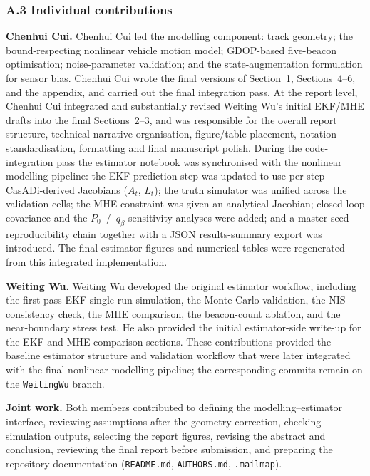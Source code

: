 \documentclass[11pt,a4paper]{article}
\newcommand{\code}[1]{\texttt{#1}}
\begin{document}
\subsubsection*{A.3 Individual contributions}

\textbf{Chenhui Cui.}
Chenhui Cui led the modelling component: track geometry; the
bound-respecting nonlinear vehicle motion model; GDOP-based
five-beacon optimisation; noise-parameter validation; and the
state-augmentation formulation for sensor bias. Chenhui Cui wrote
the final versions of Section~1, Sections~4--6, and the appendix,
and carried out the final integration pass. At the report level, Chenhui Cui
integrated and substantially revised Weiting Wu's initial EKF/MHE
drafts into the final Sections~2--3, and was responsible for the
overall report structure, technical narrative organisation,
figure/table placement, notation standardisation, formatting and
final manuscript polish. During the code-integration pass the
estimator notebook was synchronised with the nonlinear modelling
pipeline: the EKF prediction step was updated to use per-step
CasADi-derived Jacobians ($A_t$, $L_t$); the truth simulator was
unified across the validation cells; the MHE constraint was given
an analytical Jacobian; closed-loop covariance and the
$P_0$~/~$q_\beta$ sensitivity analyses were added; and a
master-seed reproducibility chain together with a JSON
results-summary export was introduced. The final estimator figures
and numerical tables were regenerated from this integrated
implementation.

\textbf{Weiting Wu.}
Weiting Wu developed the original estimator workflow, including
the first-pass EKF single-run simulation, the Monte-Carlo
validation, the NIS consistency check, the MHE comparison, the
beacon-count ablation, and the near-boundary stress test. He also
provided the initial estimator-side write-up for the EKF and MHE
comparison sections. These contributions provided the baseline
estimator structure and validation workflow that were later
integrated with the final nonlinear modelling pipeline; the
corresponding commits remain on the \texttt{WeitingWu} branch.

\textbf{Joint work.}
Both members contributed to defining the modelling--estimator
interface, reviewing assumptions after the geometry correction,
checking simulation outputs, selecting the report figures, revising
the abstract and conclusion, reviewing the final report before
submission, and preparing the repository documentation
(\code{README.md}, \code{AUTHORS.md}, \code{.mailmap}).
\end{document}
